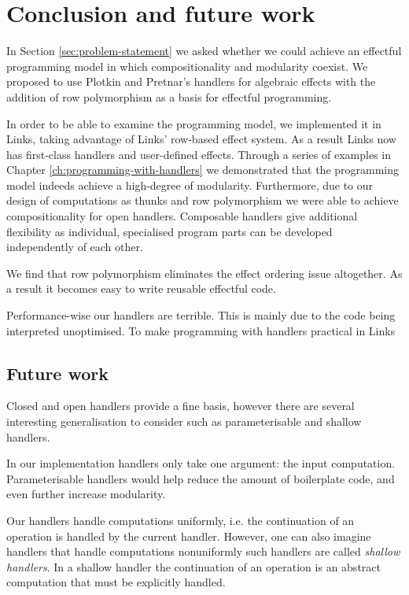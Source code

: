 \chapter{Conclusion and future work}\label{ch:conclusion}
In Section \ref{sec:problem-statement} we asked whether we could achieve an effectful programming model in which compositionality and modularity coexist. We proposed to use Plotkin and Pretnar's handlers for algebraic effects \cite{Plotkin2013} with the addition of row polymorphism as a basis for effectful programming. 

In order to be able to examine the programming model, we implemented it in Links, taking advantage of Links' row-based effect system. As a result Links now has first-class handlers and user-defined effects.
Through a series of examples in Chapter \ref{ch:programming-with-handlers} we demonstrated that the programming model indeeds achieve a high-degree of modularity. Furthermore, due to our design of computations as thunks and row polymorphism we were able to achieve compositionality for open handlers. Composable handlers give additional flexibility as individual, specialised program parts can be developed independently of each other.

We find that row polymorphism eliminates the effect ordering issue altogether. As a result it becomes easy to write reusable effectful code.

Performance-wise our handlers are terrible. This is mainly due to the code being interpreted unoptimised. To make programming with handlers practical in Links 

\section{Future work}
Closed and open handlers provide a fine basis, however there are several interesting generalisation to consider such as parameterisable and shallow handlers. 

In our implementation handlers only take one argument: the input computation. Parameterisable handlers would help reduce the amount of boilerplate code, and even further increase modularity. %

Our handlers handle computations uniformly, i.e. the continuation of an operation is handled by the current handler. However, one can also imagine handlers that handle computations nonuniformly such handlers are called \emph{shallow handlers}. In a shallow handler the continuation of an operation is an abstract computation that must be explicitly handled.

